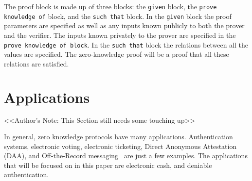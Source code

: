 \documentclass{sig-alternate}
\begin{document}
		The proof block is made up of three blocks: the \texttt{given} block, the 
		\texttt{prove knowledge of} block, and the \texttt{such that} block. In the
		\texttt{given} block the proof parameters are specified as well as any inputs
		known publicly to both the prover and the verifier. The inputs known privately to
		the prover are specified in the \texttt{prove knowledge of block}. In the 
		\texttt{such that} block the relations between all the values are specified.
		The zero-knowledge proof will be a proof that all these relations are satisfied.
		
	    
	    \begin{comment}
		\begin{verbatim}
		computation: // compute values required for proof
		  given: // declarations
		    group: G = <g. h>
		    exponents in G: x[2:3]
		  compute: // declarations and assignments
		    random exponents in G: r[1:3]
		    x_1 := x_2 * x_3
		    for(i, 1:3, c_i := g^x_i * h^r_i)
		    
		proof:
		  given: // declarations of public values
		    group: G = <g, h>
		    elements in G: c[1:3]
		    for(i, 1:3, commitment to x_i: c_i = g^x_i * h^r_i)
		  prove knowledge of: // declarations of private values
		    exponents in G: x[1:3], r[1:3]
		  such that: // protocol specification; i.e. relations
		    x_1 = x_2 * x_3
		\end{verbatim}
		
		In this example, the authors are proving that the value $x_{1}$ contained within
		the commitment $c_{1}$ is the product of $x_{2}$ and $x_{3}$ which are contained
		in $c_{2}$ and $c_{3}$ respectively. Because both blocks are optional, they are
		considered independent from each other, so a lines are repeated between the two.
		\end{comment}


\section{Applications}
	<<Author's Note: This Section still needs some touching up>>

	In general, zero knowledge protocols have many applications. Authentication systems,
	electronic voting, electronic ticketing, Direct Anonymous Attestation (DAA), and
	Off-the-Record messaging~\cite{ZKCrypt:2012, ZKPDL:2010} are just a few examples.
	The applications that will be focused on in this paper are electronic cash, and
	deniable authentication.
	
\end{document}
